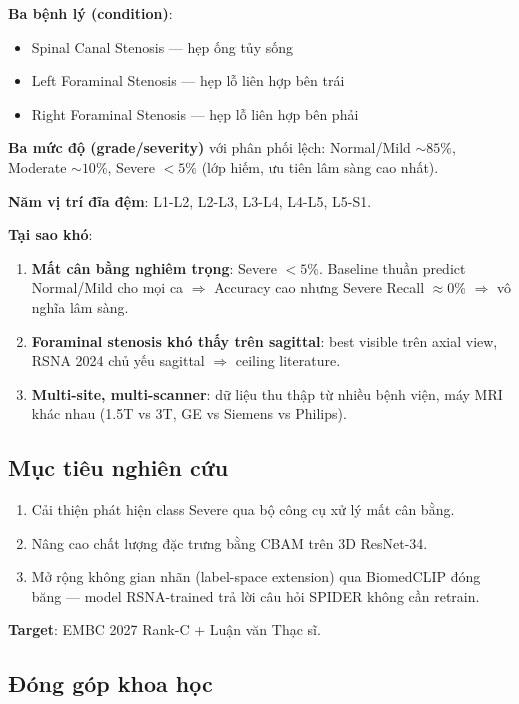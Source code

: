 \documentclass[11pt,a4paper]{article}
\begin{document}
\noindent\textbf{Ba bệnh lý (condition)}:
\begin{itemize}[leftmargin=*]
\item Spinal Canal Stenosis --- hẹp ống tủy sống
\item Left Foraminal Stenosis --- hẹp lỗ liên hợp bên trái
\item Right Foraminal Stenosis --- hẹp lỗ liên hợp bên phải
\end{itemize}

\noindent\textbf{Ba mức độ (grade/severity)} với phân phối lệch:
Normal/Mild $\sim 85\%$, Moderate $\sim 10\%$, Severe $<5\%$ (lớp hiếm,
ưu tiên lâm sàng cao nhất).

\noindent\textbf{Năm vị trí đĩa đệm}: L1-L2, L2-L3, L3-L4, L4-L5, L5-S1.

\noindent\textbf{Tại sao khó}:
\begin{enumerate}[leftmargin=*]
\item \textbf{Mất cân bằng nghiêm trọng}: Severe $<5\%$. Baseline thuần
predict Normal/Mild cho mọi ca $\Rightarrow$ Accuracy cao nhưng Severe
Recall $\approx 0\%$ $\Rightarrow$ vô nghĩa lâm sàng.
\item \textbf{Foraminal stenosis khó thấy trên sagittal}: best visible
trên axial view, RSNA 2024 chủ yếu sagittal $\Rightarrow$ ceiling
literature.
\item \textbf{Multi-site, multi-scanner}: dữ liệu thu thập từ nhiều
bệnh viện, máy MRI khác nhau (1.5T vs 3T, GE vs Siemens vs Philips).
\end{enumerate}

\subsection{Mục tiêu nghiên cứu}

\begin{enumerate}[leftmargin=*]
\item Cải thiện phát hiện class Severe qua bộ công cụ xử lý mất cân bằng.
\item Nâng cao chất lượng đặc trưng bằng CBAM trên 3D ResNet-34.
\item Mở rộng không gian nhãn (label-space extension) qua BiomedCLIP
đóng băng --- model RSNA-trained trả lời câu hỏi SPIDER không cần
retrain.
\end{enumerate}

\noindent\textbf{Target}: EMBC 2027 Rank-C + Luận văn Thạc sĩ.

\subsection{Đóng góp khoa học}
\end{document}

